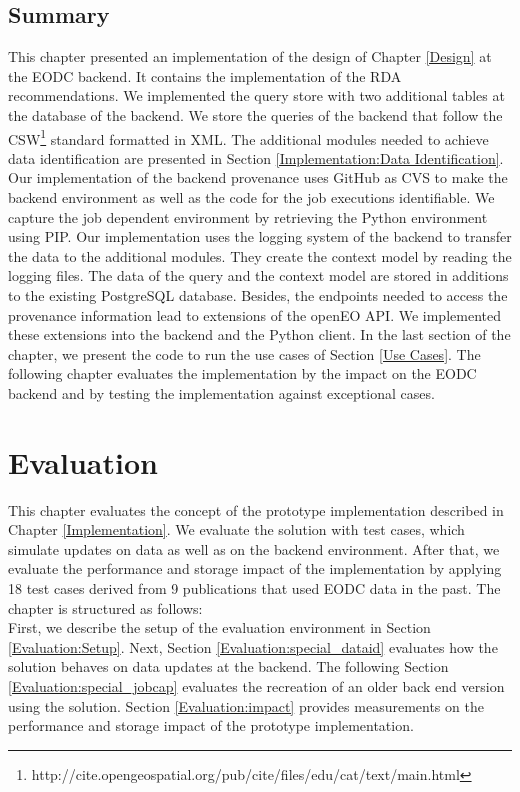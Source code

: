 \documentclass[draft,final]{vutinfth} %
\begin{document}
\section{Summary}
This chapter presented an implementation of the design of Chapter \ref{Design} at the EODC backend. It contains the implementation of the RDA recommendations. We implemented the query store with two additional tables at the database of the backend. We store the queries of the backend that follow the CSW\footnote{http://cite.opengeospatial.org/pub/cite/files/edu/cat/text/main.html} standard formatted in XML. The additional modules needed to achieve data identification are presented in Section \ref{Implementation:Data Identification}. Our implementation of the backend provenance uses GitHub as CVS to make the backend environment as well as the code for the job executions identifiable. We capture the job dependent environment by retrieving the Python environment using PIP. Our implementation uses the logging system of the backend to transfer the data to the additional modules. They create the context model by reading the logging files. The data of the query and the context model are stored in additions to the existing PostgreSQL database. Besides, the endpoints needed to access the provenance information lead to extensions of the openEO API. We implemented these extensions into the backend and the Python client. In the last section of the chapter, we present the code to run the use cases of Section \ref{Use Cases}. The following chapter evaluates the implementation by the impact on the EODC backend and by testing the implementation against exceptional cases.   

\chapter{Evaluation}\label{Evaluation}

This chapter evaluates the concept of the prototype implementation described in Chapter \ref{Implementation}. We evaluate the solution with test cases, which simulate updates on data as well as on the backend environment. After that, we evaluate the performance and storage impact of the implementation by applying 18 test cases derived from 9 publications that used EODC data in the past. The chapter is structured as follows: \\
First, we describe the setup of the evaluation environment in Section \ref{Evaluation:Setup}. Next, Section \ref{Evaluation:special_dataid} evaluates how the solution behaves on data updates at the backend. The following Section \ref{Evaluation:special_jobcap} evaluates the recreation of an older back end version using the solution. Section \ref{Evaluation:impact} provides measurements on the performance and storage impact of the prototype implementation. 
\end{document}
